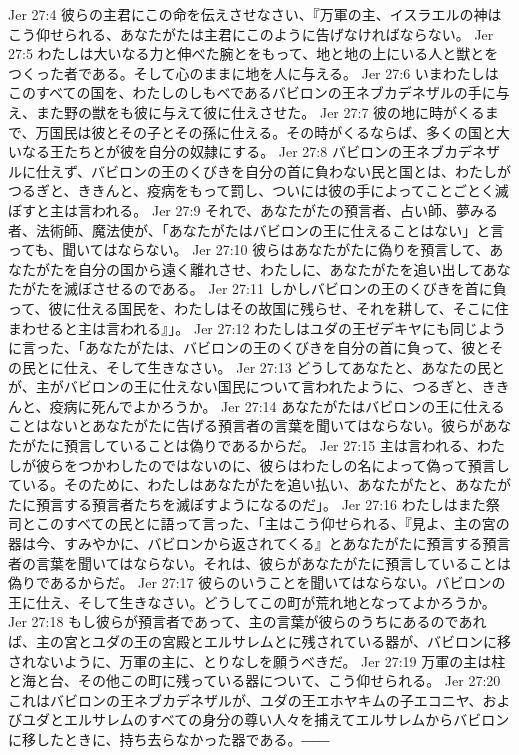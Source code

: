 Jer 27:4  彼らの主君にこの命を伝えさせなさい、『万軍の主、イスラエルの神はこう仰せられる、あなたがたは主君にこのように告げなければならない。
Jer 27:5  わたしは大いなる力と伸べた腕とをもって、地と地の上にいる人と獣とをつくった者である。そして心のままに地を人に与える。
Jer 27:6  いまわたしはこのすべての国を、わたしのしもべであるバビロンの王ネブカデネザルの手に与え、また野の獣をも彼に与えて彼に仕えさせた。
Jer 27:7  彼の地に時がくるまで、万国民は彼とその子とその孫に仕える。その時がくるならば、多くの国と大いなる王たちとが彼を自分の奴隷にする。
Jer 27:8  バビロンの王ネブカデネザルに仕えず、バビロンの王のくびきを自分の首に負わない民と国とは、わたしがつるぎと、ききんと、疫病をもって罰し、ついには彼の手によってことごとく滅ぼすと主は言われる。
Jer 27:9  それで、あなたがたの預言者、占い師、夢みる者、法術師、魔法使が、「あなたがたはバビロンの王に仕えることはない」と言っても、聞いてはならない。
Jer 27:10  彼らはあなたがたに偽りを預言して、あなたがたを自分の国から遠く離れさせ、わたしに、あなたがたを追い出してあなたがたを滅ぼさせるのである。
Jer 27:11  しかしバビロンの王のくびきを首に負って、彼に仕える国民を、わたしはその故国に残らせ、それを耕して、そこに住まわせると主は言われる』」。
Jer 27:12  わたしはユダの王ゼデキヤにも同じように言った、「あなたがたは、バビロンの王のくびきを自分の首に負って、彼とその民とに仕え、そして生きなさい。
Jer 27:13  どうしてあなたと、あなたの民とが、主がバビロンの王に仕えない国民について言われたように、つるぎと、ききんと、疫病に死んでよかろうか。
Jer 27:14  あなたがたはバビロンの王に仕えることはないとあなたがたに告げる預言者の言葉を聞いてはならない。彼らがあなたがたに預言していることは偽りであるからだ。
Jer 27:15  主は言われる、わたしが彼らをつかわしたのではないのに、彼らはわたしの名によって偽って預言している。そのために、わたしはあなたがたを追い払い、あなたがたと、あなたがたに預言する預言者たちを滅ぼすようになるのだ」。
Jer 27:16  わたしはまた祭司とこのすべての民とに語って言った、「主はこう仰せられる、『見よ、主の宮の器は今、すみやかに、バビロンから返されてくる』とあなたがたに預言する預言者の言葉を聞いてはならない。それは、彼らがあなたがたに預言していることは偽りであるからだ。
Jer 27:17  彼らのいうことを聞いてはならない。バビロンの王に仕え、そして生きなさい。どうしてこの町が荒れ地となってよかろうか。
Jer 27:18  もし彼らが預言者であって、主の言葉が彼らのうちにあるのであれば、主の宮とユダの王の宮殿とエルサレムとに残されている器が、バビロンに移されないように、万軍の主に、とりなしを願うべきだ。
Jer 27:19  万軍の主は柱と海と台、その他この町に残っている器について、こう仰せられる。
Jer 27:20  これはバビロンの王ネブカデネザルが、ユダの王エホヤキムの子エコニヤ、およびユダとエルサレムのすべての身分の尊い人々を捕えてエルサレムからバビロンに移したときに、持ち去らなかった器である。――
